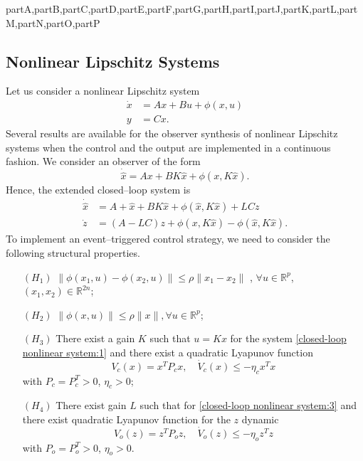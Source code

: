 \documentclass[letterpaper, 10 pt, conference]{ieeeconf}
\def\compile{partA,partB,partC,partD,partE,partF,partG,partH,partI,partJ,partK,partL,partM,partN,partO,partP}
\newcommand{\R}{\mathbb{R}}
\begin{document}
\begin{xcomment}{\compile}
\begin{partN}
\subsection{Nonlinear Lipschitz Systems}

Let us consider a nonlinear Lipschitz system 
\begin{equation}
\begin{aligned}
\dot x&=Ax+Bu+\phi(x,u) \\
y&=Cx.
\end{aligned} \label{eqlip}                   
\end{equation}
Several results are available for the observer synthesis of nonlinear Lipschitz systems when the control and the output are implemented in a continuous fashion. We consider an observer of the form
\begin{equation}
\dot{\hat x}=Ax +BK\hat x+\phi(x,K\hat x).   \label{closed-loop nonlinear system:1}
\end{equation}
Hence, the extended closed--loop system is
\begin{subequations}
\label{closed-loop  nonlinear system}
\begin{align}
\dot{\hat x}&=A+\hat x +BK\hat x+\phi(\hat x,K\hat x)+LCz    \label{closed-loop nonlinear system:2} \\
\dot z&=(A-LC)z +\phi(x,K\hat x)-\phi(\hat x,K\hat x).        \label{closed-loop nonlinear system:3}
\end{align}
\end{subequations}
To implement an event--triggered control strategy, we need to consider the following structural properties.
\begin{enumerate}
\item[$(H_1)$] $\|\phi(x_1, u)-\phi(x_2, u)\| \le  \rho \|x_1-x_2\|$ , $\forall u \in \R^p$, $(x_1,x_2) \in \R^{2n}$;
\item[$(H_2)$] $\|\phi(x, u)\| \le  \rho \|x\| , \forall u \in\R^p$;
\item[$(H_3)$] There exist a gain $K$ such that $u=Kx$ for the system \eqref{closed-loop nonlinear system:1} and there exist a quadratic Lyapunov function
\begin{equation}
V_c(x)=x^TP_cx ,\quad\dot V_c(x)\le -\eta_c x^Tx   \label{Vc}
\end{equation} 
with $P_c=P_c^T>0$, $\eta_c>0$;
\item[$(H_4)$] There exist gain $L$ such that for \eqref{closed-loop nonlinear system:3} and there exist  quadratic Lyapunov function for the $z$ dynamic 
\begin{equation}
V_o(z)=z^TP_oz, \quad \dot V_o(z)\le-\eta_o z^Tz        \label{Vo} 
\end{equation}
with $P_o=P_o^T>0$, $\eta_o>0$.
\end{enumerate}



\end{partN}
\end{xcomment}
\end{document}
